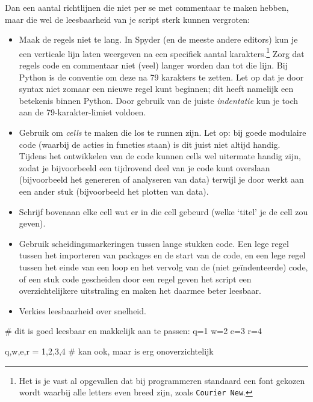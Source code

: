 \documentclass[a4paper,11pt, fleqn]{article}
\begin{document}
Dan een aantal richtlijnen die niet per se met commentaar te maken hebben, maar die wel de leesbaarheid van je script sterk kunnen vergroten:
\begin{itemize}
	\item Maak de regels niet te lang. In Spyder (en de meeste andere editors) kun je een verticale lijn laten weergeven na een specifiek aantal karakters.\footnote{Het is je vast al opgevallen dat bij programmeren standaard een font gekozen wordt waarbij alle letters even breed zijn, zoals \texttt{Courier New}.} Zorg dat regels code en commentaar niet (veel) langer worden dan tot die lijn. Bij Python is de conventie om deze na 79 karakters te zetten. Let op dat je door syntax niet zomaar een nieuwe regel kunt beginnen; dit heeft namelijk een betekenis binnen Python. Door gebruik van de juiste \textit{indentatie} kun je toch aan de 79-karakter-limiet voldoen.
	\item Gebruik \pythoninline{#\%\%} om \textit{cells} te maken die los te runnen zijn. Let op: bij goede modulaire code (waarbij de acties in functies staan) is dit juist niet altijd handig. Tijdens het ontwikkelen van de code kunnen cells wel uitermate handig zijn, zodat je bijvoorbeeld een tijdrovend deel van je code kunt overslaan (bijvoorbeeld het genereren of analyseren van data) terwijl je door werkt aan een ander stuk (bijvoorbeeld het plotten van data).
	\item Schrijf bovenaan elke cell wat er in die cell gebeurd (welke `titel' je de cell zou geven).
	\item Gebruik scheidingsmarkeringen tussen lange stukken code. Een lege regel tussen het importeren van packages en de start van de code, en een lege regel tussen het einde van een loop en het vervolg van de (niet ge\"indenteerde) code, of een stuk code gescheiden door een regel \pythoninline{#---------} geven het script een overzichtelijkere uitstraling en maken het daarmee beter leesbaar.
	\item Verkies leesbaarheid over snelheid.
\end{itemize}
\begin{python}
	# dit is goed leesbaar en makkelijk aan te passen:
	q=1
	w=2
	e=3
	r=4
	
	q,w,e,r = 1,2,3,4 # kan ook, maar is erg onoverzichtelijk
\end{python}
\end{document}

